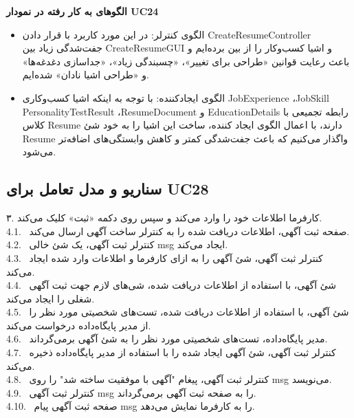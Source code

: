 \documentclass[12pt]{article}
\begin{document}
	\textbf{الگوهای به کار رفته در نمودار UC24}
	\begin{itemize}
		\item الگوی کنترلر: در این مورد کاربرد با قرار دادن CreateResumeController جفت‌شدگی زیاد بین CreateResumeGUI و اشیا کسب‌و‌کار را از بین برده‌ایم و باعث رعایت قوانین «طراحی برای تغییر»، «چسبندگی زیاد»، «جداسازی دغدغه‌ها» و «طراحی اشیا نادان» شده‌ایم.
		\item
		الگوی ایجاد‌کننده: با توجه به اینکه اشیا کسب‌و‌کاری JobExperience ،JobSkill PersonalityTestResult ،ResumeDocument و EducationDetails رابطه تجمیعی با کلاس Resume دارند، با اعمال الگوی ایجاد کننده، ساخت این اشیا را به خود شئ Resume واگذار می‌کنیم که باعث جفت‌شدگی کمتر و کاهش وابستگی‌های اضافه‌تر می‌شود.
\end{itemize}

	\newpage
	\subsection{سناریو و مدل تعامل برای UC28}
	۳. کارفرما اطلاعات خود را وارد می‌کند و سپس روی دکمه «ثبت» کلیک می‌کند. \\
	4.1. \ صفحه ثبت آگهی، اطلاعات دریافت شده را به کنترلر ساخت آگهی ارسال می‌کند.\\
	4.2. \ کنترلر ثبت آگهی، یک شئ خالی msg ایجاد می‌کند.\\
	4.3. \ کنترلر ثبت آگهی، شئ آگهی را به ازای کارفرما و اطلاعات وارد شده ایجاد می‌کند.\\
	4.4. \ شئ آگهی، با استفاده از اطلاعات دریافت شده، شی‌های لازم جهت ثبت آگهی شغلی را ایجاد می‌کند.\\
	4.5. \ شئ آگهی، با استفاده از اطلاعات دریافت شده، تست‌های شخصیتی مورد نظر را از مدیر پایگاه‌داده درخواست می‌کند.\\
	4.6. \ مدیر‌ پایگاه‌داده، تست‌های شخصیتی مورد نظر را به شئ آگهی برمی‌گرداند.\\
	4.7. \ کنترلر ثبت آگهی، شئ آگهی ایجاد شده را با استفاده از مدیر پایگاه‌داده ذخیره می‌کند.\\
	4.8. \ کنترلر ثبت آگهی، پیغام "آگهی با موفقیت ساخته شد" را روی msg می‌نویسد.\\
	4.9. \ کنترلر ثبت آگهی msg را به صفحه ثبت آگهی برمی‌گرداند.\\
	4.10. \ صفحه ثبت آگهی پیام msg را به کارفرما نمایش می‌دهد.\\
\end{document}
